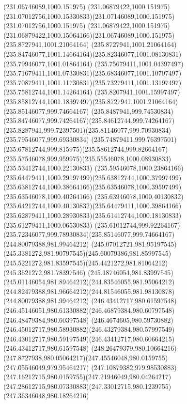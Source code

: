 {    \moveto(231.06746089,1000.151975)
    \curveto(231.06879422,1000.151975)(231.07012756,1000.15330833)(231.07146089,1000.151975)
    \lineto(231.07012756,1000.151975)
    \curveto(231.06879422,1000.151975)(231.06879422,1000.15064166)(231.06746089,1000.151975)
    \moveto(235.8727941,1001.21064164)
    \lineto(235.8727941,1001.21064164)
    \curveto(235.84746077,1001.14664164)(235.82346077,1001.08130831)(235.79946077,1001.01864164)
    \curveto(235.75679411,1001.04397497)(235.71679411,1001.07330831)(235.68346077,1001.10797497)
    \curveto(235.70879411,1001.11730831)(235.73279411,1001.13197497)(235.75812744,1001.14264164)
    \curveto(235.8207941,1001.15997497)(235.85812744,1001.18397497)(235.8727941,1001.21064164)
    \moveto(235.85146077,999.74664167)
    \curveto(235.8487941,999.74530834)(235.84746077,999.74264167)(235.84612744,999.74264167)
    \curveto(235.8287941,999.72397501)(235.81146077,999.70930834)(235.79546077,999.69330834)
    \curveto(235.74879411,999.76397501)(235.67812744,999.815975)(235.58612744,999.82664167)
    \curveto(235.57546078,999.959975)(235.55546078,1000.08930833)(235.53412744,1000.22130833)
    \curveto(235.59546078,1000.23864166)(235.64479411,1000.29197499)(235.63812744,1000.37997499)
    \curveto(235.63812744,1000.38664166)(235.63546078,1000.39597499)(235.63546078,1000.40264166)
    \curveto(235.63946078,1000.40130832)(235.64212744,1000.40130832)(235.64479411,1000.39864166)
    \curveto(235.62879411,1000.28930833)(235.61412744,1000.18130833)(235.61279411,1000.06530833)
    \curveto(235.61012744,999.92264167)(235.72346077,999.78930834)(235.85146077,999.74664167)
    \moveto(244.80079388,981.99464212)
    \curveto(245.07012721,981.95197545)(245.3381272,981.90797545)(245.60079386,981.85997545)
    \curveto(245.5221272,981.83597545)(245.4421272,981.81064212)(245.3621272,981.78397546)
    \curveto(245.18746054,981.83997545)(245.01146054,981.89464212)(244.83546055,981.95064212)
    \curveto(244.82479388,981.96664212)(244.81546055,981.98130878)(244.80079388,981.99464212)
    \moveto(246.43412717,980.61597548)
    \curveto(246.45146051,980.61330882)(246.46879384,980.60797548)(246.48479384,980.60397548)
    \curveto(246.4674605,980.59730882)(246.45012717,980.58930882)(246.43279384,980.57997549)
    \curveto(246.43012717,980.59197549)(246.43412717,980.60664215)(246.43412717,980.61597548)
    \moveto(248.26479379,980.10664216)
    \curveto(247.8727938,980.05064217)(247.45546048,980.0159755)(247.05546049,979.95464217)
    \curveto(247.10879382,979.98530883)(247.16212715,980.0159755)(247.21946049,980.04264217)
    \curveto(247.28612715,980.07330883)(247.33012715,980.1239755)(247.36346048,980.18264216)
}
